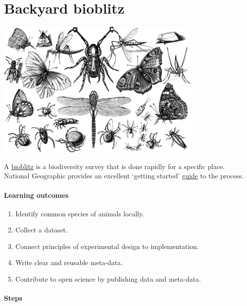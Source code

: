 \documentclass[
]{book}
\providecommand{\tightlist}{%
  \setlength{\itemsep}{0pt}\setlength{\parskip}{0pt}}
\begin{document}
\hypertarget{bioblitz}{%
\chapter{Backyard bioblitz}\label{bioblitz}}

\includegraphics[width=4in,height=\textheight]{./insects.png}

A \href{https://en.wikipedia.org/wiki/BioBlitz}{bioblitz} is a biodiversity survey that is done rapidly for a specific place. National Geographic provides an excellent `getting started' \href{https://media.nationalgeographic.org/assets/file/NationalGeographicBioBlitzGuide.pdf}{guide} to the process.

\hypertarget{learning-outcomes}{%
\subsubsection*{Learning outcomes}\label{learning-outcomes}}

\begin{enumerate}
\def\labelenumi{\arabic{enumi}.}
\tightlist
\item
  Identify common species of animals locally.\\
\item
  Collect a dataset.\\
\item
  Connect principles of experimental design to implementation.\\
\item
  Write clear and reusable meta-data.\\
\item
  Contribute to open science by publishing data and meta-data.
\end{enumerate}

\hypertarget{steps}{%
\subsubsection*{Steps}\label{steps}}
\end{document}
